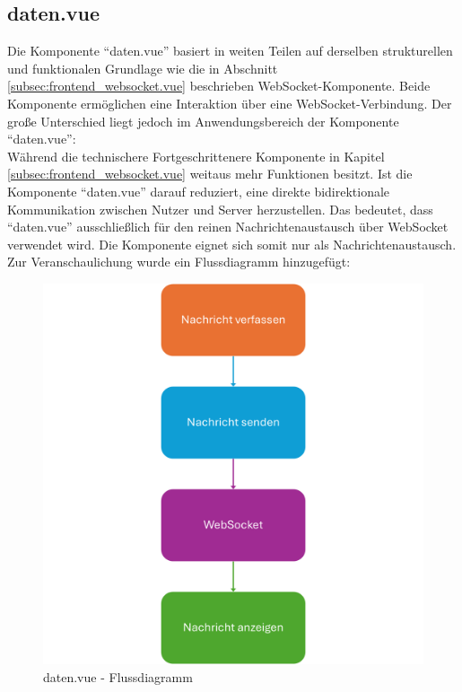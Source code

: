 \subsection{daten.vue}
\label{subsec:frontend_daten.vue}
Die Komponente ``daten.vue'' basiert in weiten Teilen auf derselben strukturellen 
und funktionalen Grundlage wie die in Abschnitt \ref{subsec:frontend_websocket.vue} beschrieben 
WebSocket-Komponente. 
%
Beide Komponente ermöglichen eine Interaktion über eine WebSocket-Verbindung.
%
Der große Unterschied liegt jedoch im Anwendungsbereich der Komponente 
``daten.vue'':\\
Während die technischere Fortgeschrittenere Komponente in Kapitel \ref{subsec:frontend_websocket.vue} 
weitaus mehr Funktionen besitzt. 
Ist die Komponente ``daten.vue'' darauf reduziert, 
eine direkte bidirektionale Kommunikation zwischen Nutzer und Server herzustellen.
%
Das bedeutet, dass ``daten.vue'' ausschließlich für den reinen Nachrichtenaustausch über
WebSocket verwendet wird. 
Die Komponente eignet sich somit nur als Nachrichtenaustausch.
%
Zur Veranschaulichung wurde ein Flussdiagramm hinzugefügt:
\begin{figure}[H]
  \includegraphics[width=\textwidth, center]{img/Daten_FD.png}
  \caption{daten.vue - Flussdiagramm}
  \label{fig:daten_Flowchart}
\end{figure}

